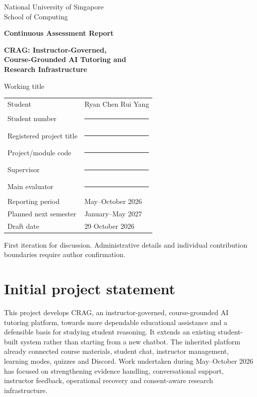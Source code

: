 \documentclass[11pt,a4paper]{article}
\newcommand{\blankfield}{\rule{0.49\textwidth}{0.35pt}}
\begin{document}
\hypersetup{pageanchor=false}
\begin{titlepage}
\thispagestyle{empty}
\vspace*{12mm}
{\large National University of Singapore\\School of Computing\par}
\vspace{14mm}
{\huge\bfseries Continuous Assessment Report\par}
\vspace{7mm}
{\LARGE\bfseries CRAG: Instructor-Governed,\\Course-Grounded AI Tutoring and\\Research Infrastructure\par}
\vspace{3mm}
{\small Working title\par}
\vspace{13mm}
\begin{tabular}{@{}P{0.30\textwidth}P{0.63\textwidth}@{}}
Student & Ryan Chen Rui Yang\\[8pt]
Student number & \blankfield\\[8pt]
Registered project title & \blankfield\\[8pt]
Project/module code & \blankfield\\[8pt]
Supervisor & \blankfield\\[8pt]
Main evaluator & \blankfield\\[8pt]
Reporting period & May--October 2026\\[8pt]
Planned next semester & January--May 2027\\[8pt]
Draft date & 29 October 2026
\end{tabular}
\vfill
{\small First iteration for discussion. Administrative details and individual contribution boundaries require author confirmation.}
\end{titlepage}
\hypersetup{pageanchor=true}

\section*{Initial project statement}
This project develops CRAG, an instructor-governed, course-grounded AI tutoring platform, towards more dependable educational assistance and a defensible basis for studying student reasoning. It extends an existing student-built system rather than starting from a new chatbot. The inherited platform already connected course materials, student chat, instructor management, learning modes, quizzes and Discord. Work undertaken during May--October 2026 has focused on strengthening evidence handling, conversational support, instructor feedback, operational recovery and consent-aware research infrastructure.
\end{document}

